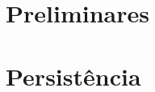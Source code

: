 \documentclass[11pt,oneside,a4paper, openany]{book}
\begin{document}


\part{Preliminares} \label{part:prelim}
%





\part{Persistência} \label{part:persist}
%












%
%
%





\end{document}
